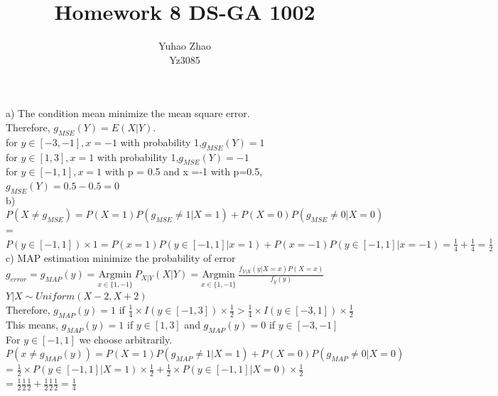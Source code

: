 \documentclass[11pt]{article}
\newenvironment{problem}[2][Problem]{\begin{trivlist}
\item[\hskip \labelsep {\bfseries #1}\hskip \labelsep {\bfseries #2.}]}{\end{trivlist}}
\begin{document}
 
 
\title{Homework 8 DS-GA 1002 }%
\author{Yuhao Zhao\\ %
Yz3085} %
 
\maketitle
\begin{problem}{1}
\end{problem}
a) The condition mean minimize the mean square error.\\
 Therefore, $g_{MSE}(Y) = E(X|Y) $.\\
 for $y\in [-3,-1], x =-1$ with probability 1,$g_{MSE}(Y) = 1$\\ 
 for $y\in [1,3], x =1$ with probability 1,$g_{MSE}(Y) = -1$\\
 for $y\in [-1,1], x =1$ with p = 0.5 and x =-1 with p=0.5,$g_{MSE}(Y) = 0.5-0.5 = 0$\\
 
 
 b) $P(X \neq g_{MSE}) = P(X = 1)P(g_{MSE} \neq 1|X=1) + P(X = 0)P(g_{MSE} \neq 0|X=0)$\\
 = $P(y\in[-1,1])\times 1 = P(x=1)P(y\in[-1,1]|x=1)+P(x=-1)P(y\in[-1,1]|x=-1) = \frac{1}{4}+\frac{1}{4} = \frac{1}{2}$ \\
 
 c) MAP estimation minimize the probability of error\\
 $g_{error} = g_{MAP}(y) =\underset{x \in \{1, -1\}} {\mathrm{Argmin}} ~ P_{X|Y}(X|Y) =\underset{x \in \{1, -1\}} {\mathrm{Argmin}} ~ \frac{f_{Y|X}(y|X=x) P(X = x)}{f_y(y)}  $\\
 $Y|X \sim Uniform(X-2,X+2)$\\
 Therefore, $g_{MAP}(y)  =1$ if $ \frac{1}{4}\times I(y\in[-1,3])\times \frac{1}{2}> \frac{1}{4}\times I(y\in[-3,1])\times \frac{1}{2}$\\
 This means, $g_{MAP}(y) = 1$ if $y\in [1,3]$ and $g_{MAP}(y) = 0$  if  $y\in [-3,-1]$\\
 For $y \in [-1,1]$ we choose arbitrarily.\\
 
 $P(x\neq g_{MAP}(y)) =P(X = 1)P(g_{MAP} \neq 1|X=1) + P(X = 0)P(g_{MAP} \neq 0|X=0) $\\
 = $\frac{1}{2} \times P(y\in [-1,1]|X=1)\times \frac{1}{2} + \frac{1}{2} \times P(y\in [-1,1]|X=0)\times \frac{1}{2}$\\
 = $\frac{1}{2}\frac{1}{2}\frac{1}{2}+\frac{1}{2}\frac{1}{2}\frac{1}{2} = \frac{1}{4}$\\
 
\end{document}
